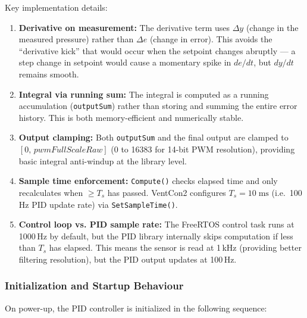 \documentclass[12pt,a4paper]{article}
\begin{document}
\noindent
Key implementation details:

\begin{enumerate}
    \item \textbf{Derivative on measurement:} The derivative term uses $\Delta y$ (change in the measured pressure) rather than $\Delta e$ (change in error). This avoids the ``derivative kick'' that would occur when the setpoint changes abruptly --- a step change in setpoint would cause a momentary spike in $de/dt$, but $dy/dt$ remains smooth.
    
    \item \textbf{Integral via running sum:} The integral is computed as a running accumulation (\texttt{outputSum}) rather than storing and summing the entire error history. This is both memory-efficient and numerically stable.
    
    \item \textbf{Output clamping:} Both \texttt{outputSum} and the final output are clamped to $[0,\, \mathit{pwmFullScaleRaw}]$ (0 to 16383 for 14-bit PWM resolution), providing basic integral anti-windup at the library level.
    
    \item \textbf{Sample time enforcement:} \texttt{Compute()} checks elapsed time and only recalculates when $\geq T_s$ has passed. VentCon2 configures $T_s = 10\;\text{ms}$ (i.e.\ 100\,Hz PID update rate) via \texttt{SetSampleTime()}.
    
    \item \textbf{Control loop vs. PID sample rate:} The FreeRTOS control task runs at 1000\,Hz by default, but the PID library internally skips computation if less than $T_s$ has elapsed. This means the sensor is read at 1\,kHz (providing better filtering resolution), but the PID output updates at 100\,Hz.
\end{enumerate}

\subsubsection{Initialization and Startup Behaviour}
\label{sec:pid-init}

On power-up, the PID controller is initialized in the following sequence:
\end{document}
